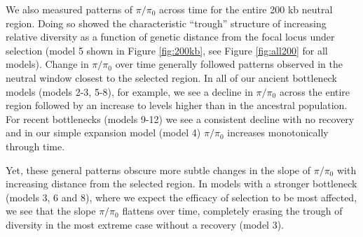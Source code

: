 \documentclass[9pt,twocolumn,twoside]{rilabRxiv}
\begin{document}
We also measured patterns of $\pi/\pi_0$ across time for the entire 200 kb neutral region.
Doing so showed the characteristic ``trough'' structure of increasing relative diversity as a function of genetic distance from the focal locus under selection (model 5 shown in Figure \ref{fig:200kb}, see Figure \ref{fig:all200} for all models). Change in $\pi/\pi_0$ over time generally followed patterns observed in the neutral window closest to the selected region. In all of our ancient bottleneck models (models 2-3, 5-8), for example, we see a decline in $\pi/\pi_0$ across the entire region followed by an increase to levels higher than in the ancestral population. For recent bottlenecks (models 9-12) we see a consistent decline with no recovery and in our simple expansion model (model 4) $\pi/\pi_0$ increases monotonically through time.

Yet, these general patterns obscure more subtle changes in the slope of $\pi/\pi_0$ with increasing distance from the selected region. In models with a stronger bottleneck (models 3, 6 and 8), where we expect the efficacy of selection to be most affected, we see that the slope $\pi/\pi_0$ flattens over time, completely erasing the trough of diversity in the most extreme case without a recovery (model 3). 
\end{document}
